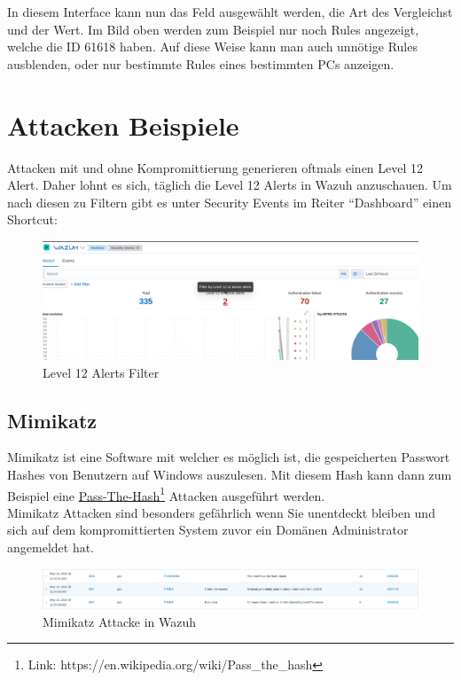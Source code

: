 In diesem Interface kann nun das Feld ausgewählt werden, die Art des Vergleichst und der Wert.
Im Bild oben werden zum Beispiel nur noch Rules angezeigt, welche die ID 61618 haben.
Auf diese Weise kann man auch unnötige Rules ausblenden, oder nur bestimmte Rules eines bestimmten PCs anzeigen.

\section{Attacken Beispiele}
Attacken mit und ohne Kompromittierung generieren oftmals einen Level 12 Alert. Daher lohnt es sich, täglich die Level 12 Alerts in Wazuh anzuschauen.
Um nach diesen zu Filtern gibt es unter Security Events im Reiter ``Dashboard'' einen Shortcut:
\begin{figure}[H]
    \centering
    \includegraphics[width=\linewidth]{../img/filter-by-level12.png}
    \caption{Level 12 Alerts Filter}
\end{figure}


\subsection{Mimikatz}
Mimikatz ist eine Software mit welcher es möglich ist, die gespeicherten Passwort Hashes von Benutzern auf Windows auszulesen.
Mit diesem Hash kann dann zum Beispiel eine \href{https://en.wikipedia.org/wiki/Pass_the_hash}{Pass-The-Hash}\footnote{Link: https://en.wikipedia.org/wiki/Pass_the_hash} Attacken ausgeführt werden.\\

Mimikatz Attacken sind besonders gefährlich wenn Sie unentdeckt bleiben und sich auf dem kompromittierten System zuvor ein Domänen Administrator angemeldet hat.
\begin{figure}[H]
    \centering
    \includegraphics[width=\linewidth]{../img/mimikatz.png}
    \caption{Mimikatz Attacke in Wazuh}
\end{figure}

